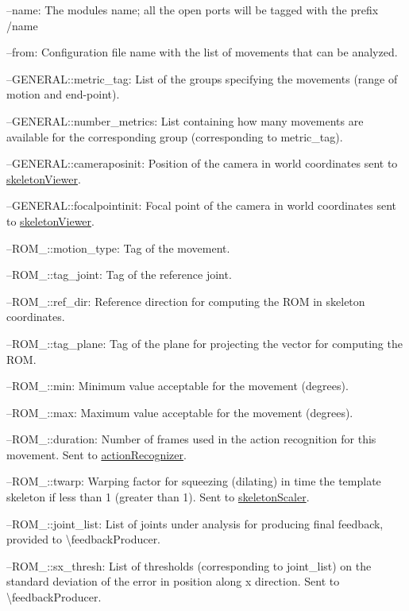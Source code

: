 \begin{DoxyItemize}
\item --name\+: The module\textquotesingle{}s name; all the open ports will be tagged with the prefix /name
\item --from\+: Configuration file name with the list of movements that can be analyzed.
\item --G\+E\+N\+E\+R\+A\+L\+::metric\+\_\+tag\+: List of the groups specifying the movements (range of motion and end-\/point).
\item --G\+E\+N\+E\+R\+A\+L\+::number\+\_\+metrics\+: List containing how many movements are available for the corresponding group (corresponding to metric\+\_\+tag).
\item --G\+E\+N\+E\+R\+A\+L\+::cameraposinit\+: Position of the camera in world coordinates sent to \mbox{\hyperlink{group__skeletonViewer}{skeleton\+Viewer}}.
\item --G\+E\+N\+E\+R\+A\+L\+::focalpointinit\+: Focal point of the camera in world coordinates sent to \mbox{\hyperlink{group__skeletonViewer}{skeleton\+Viewer}}.
\item --R\+O\+M\+\_\+::motion\+\_\+type\+: Tag of the movement.
\item --R\+O\+M\+\_\+::tag\+\_\+joint\+: Tag of the reference joint.
\item --R\+O\+M\+\_\+::ref\+\_\+dir\+: Reference direction for computing the R\+OM in skeleton coordinates.
\item --R\+O\+M\+\_\+::tag\+\_\+plane\+: Tag of the plane for projecting the vector for computing the R\+OM.
\item --R\+O\+M\+\_\+::min\+: Minimum value acceptable for the movement (degrees).
\item --R\+O\+M\+\_\+::max\+: Maximum value acceptable for the movement (degrees).
\item --R\+O\+M\+\_\+::duration\+: Number of frames used in the action recognition for this movement. Sent to \mbox{\hyperlink{group__actionRecognizer}{action\+Recognizer}}.
\item --R\+O\+M\+\_\+::twarp\+: Warping factor for squeezing (dilating) in time the template skeleton if less than 1 (greater than 1). Sent to \mbox{\hyperlink{group__skeletonScaler}{skeleton\+Scaler}}.
\item --R\+O\+M\+\_\+::joint\+\_\+list\+: List of joints under analysis for producing final feedback, provided to \textbackslash{}feedback\+Producer.
\item --R\+O\+M\+\_\+::sx\+\_\+thresh\+: List of thresholds (corresponding to joint\+\_\+list) on the standard deviation of the error in position along x direction. Sent to \textbackslash{}feedback\+Producer.

\end{DoxyItemize}
